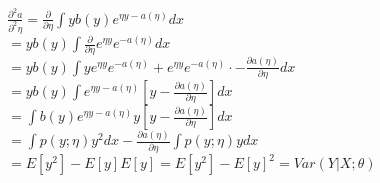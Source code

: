 \begin{answer}\\
$\frac{\partial^2 a}{\partial^2 \eta}=\frac{\partial}{\partial \eta} \int y b(y) e^{\eta y - a(\eta)} dx$\\
$=y b(y) \int \frac{\partial}{\partial \eta}  e^{\eta y} e^{-a(\eta)} dx$\\
$=y b(y) \int ye^{\eta y}e^{-a(\eta)}+e^{\eta y}e^{-a(\eta)} \cdot -\frac{\partial a(\eta)}{\partial \eta}dx$\\
$=y b(y) \int e^{\eta y-a(\eta)}[y-\frac{\partial a(\eta)}{\partial \eta}]dx$\\
$=\int b(y)e^{\eta y-a(\eta)} y [y-\frac{\partial a(\eta)}{\partial \eta}]dx$\\
$=\int p(y;\eta) y^2 dx-\frac{\partial a(\eta)}{\partial \eta} \int p(y;\eta) y dx$\\
$=E[y^2]-E[y]E[y]=E[y^2]-E[y]^2=Var(Y|X;\theta)$\\
\end{answer}
